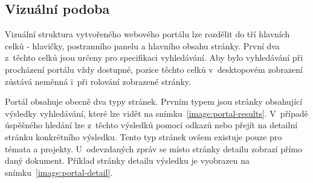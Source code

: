 \subsection{Vizuální podoba}
Vizuální struktura vytvořeného webového portálu lze rozdělit do tří hlavních celků - hlavičky, postranního panelu a hlavního obsahu stránky. První dva z~těchto celků jsou určeny pro specifikaci vyhledávání. Aby bylo vyhledávání při procházení portálu vždy dostupné, pozice těchto celků v~desktopovém zobrazení zůstává neměnná i~při rolování zobrazené stránky.

Portál obsahuje obecně dva typy stránek. Prvním typem jsou stránky obsahující výsledky vyhledávání, které lze vidět na snímku~\ref{image:portal-results}. V~případě úspěšného hledání lze z~těchto výsledků pomocí odkazů  nebo  přejít na detailní stránku konkrétního výsledku. Tento typ stránek ovšem existuje pouze pro témata a projekty. U~odevzdaných zpráv se místo stránky detailu zobrazí přímo daný dokument. Příklad stránky detailu výsledku je vyobrazen na snímku~\ref{image:portal-detail}.

